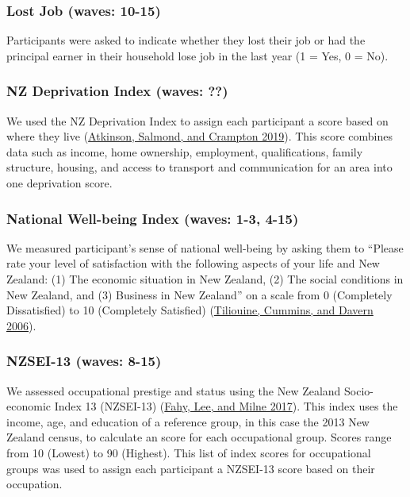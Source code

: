 \documentclass[
  singlecolumn]{report}
\begin{document}
\hypertarget{lost-job-waves-10-15}{%
\subsubsection{Lost Job (waves: 10-15)}\label{lost-job-waves-10-15}}

Participants were asked to indicate whether they lost their job or had
the principal earner in their household lose job in the last year (1 =
Yes, 0 = No).

\hypertarget{nz-deprivation-index-waves}{%
\subsubsection{NZ Deprivation Index (waves:
??)}\label{nz-deprivation-index-waves}}

We used the NZ Deprivation Index to assign each participant a score
based on where they live (\protect\hyperlink{ref-atkinson2019}{Atkinson,
Salmond, and Crampton 2019}). This score combines data such as income,
home ownership, employment, qualifications, family structure, housing,
and access to transport and communication for an area into one
deprivation score.

\hypertarget{national-well-being-index-waves-1-3-4-15}{%
\subsubsection{National Well-being Index (waves: 1-3,
4-15)}\label{national-well-being-index-waves-1-3-4-15}}

We measured participant's sense of national well-being by asking them to
``Please rate your level of satisfaction with the following aspects of
your life and New Zealand: (1) The economic situation in New Zealand,
(2) The social conditions in New Zealand, and (3) Business in New
Zealand'' on a scale from 0 (Completely Dissatisfied) to 10 (Completely
Satisfied) (\protect\hyperlink{ref-tiliouine2006}{Tiliouine, Cummins,
and Davern 2006}).

\hypertarget{nzsei-13-waves-8-15}{%
\subsubsection{NZSEI-13 (waves: 8-15)}\label{nzsei-13-waves-8-15}}

We assessed occupational prestige and status using the New Zealand
Socio-economic Index 13 (NZSEI-13)
(\protect\hyperlink{ref-fahy2017}{Fahy, Lee, and Milne 2017}). This
index uses the income, age, and education of a reference group, in this
case the 2013 New Zealand census, to calculate an score for each
occupational group. Scores range from 10 (Lowest) to 90 (Highest). This
list of index scores for occupational groups was used to assign each
participant a NZSEI-13 score based on their occupation.
\end{document}
